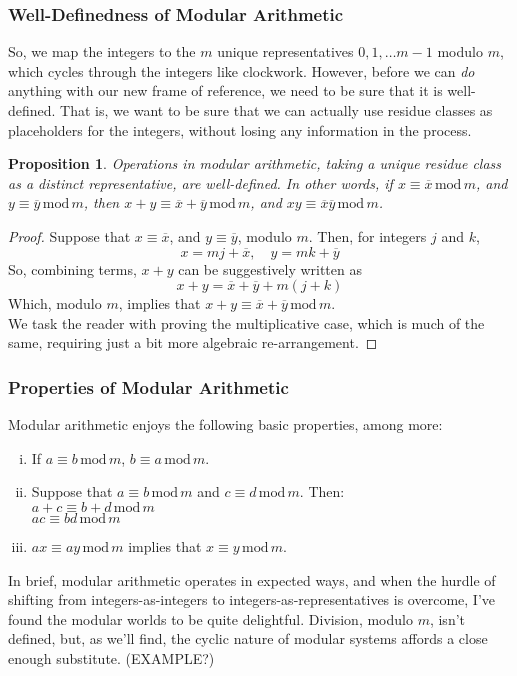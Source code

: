 \documentclass{article}
\newtheorem{prop}{Proposition}
\newcommand{\X}[1]{\, \text{mod} \, #1}
\begin{document}
\subsubsection*{Well-Definedness of Modular Arithmetic} 
So, we map the integers to the $m$ unique representatives $0, 1, \dots m-1$ modulo $m$, which cycles through the integers like clockwork. However, before we can \textit{do} anything with our new frame of reference, we need to be sure that it is well-defined. That is, we want to be sure that we can actually use residue classes as placeholders for the integers, without losing any information in the process. 
\begin{mdframed} 
\begin{prop} Operations in modular arithmetic, taking a unique residue class as a distinct representative, are well-defined. In other words, if $x\equiv \overline{x} \X{m}$, and $y\equiv\overline{y}\X{m}$, then $x + y\equiv\overline{x} + \overline{y}\X{m}$, and $xy\equiv\overline{x}\overline{y}\X{m}$. 
\end{prop} 
\begin{proof} 
Suppose that $x\equiv \overline{x}$, and $y\equiv\overline{y}$, modulo $m$. Then, for integers $j$ and $k$, 
\[x = mj + \overline{x}, \quad y = mk + \overline{y} \]
So, combining terms, $x + y$ can be suggestively written as 
\[x + y = \overline{x} + \overline{y} + m(j + k) \]
Which, modulo $m$, implies that $x + y\equiv\overline{x} + \overline{y}\X{m}$. \\
We task the reader with proving the multiplicative case, which is much of the same, requiring just a bit more algebraic re-arrangement. 
\end{proof} 
\end{mdframed} 

\subsubsection*{Properties of Modular Arithmetic} 
Modular arithmetic enjoys the following basic properties, among more: 
\begin{enumerate}[(i)] 
\item If $a\equiv b\X{m}$, $b\equiv a\X{m}$. 
\item Suppose that $a\equiv b\X{m}$ and $c\equiv d\X{m}$. Then: \\
$a + c\equiv b+d\X{m}$\\
$ac\equiv bd\X{m}$ 
\item $ax\equiv ay\X{m}$ implies that $x\equiv y\X{m}$. 
\end{enumerate} 
In brief, modular arithmetic operates in expected ways, and when the hurdle of shifting from integers-as-integers to integers-as-representatives is overcome, I've found the modular worlds to be quite delightful. Division, modulo $m$, isn't defined, but, as we'll find, the cyclic nature of modular systems affords a close enough substitute. (EXAMPLE?) 
\end{document}
